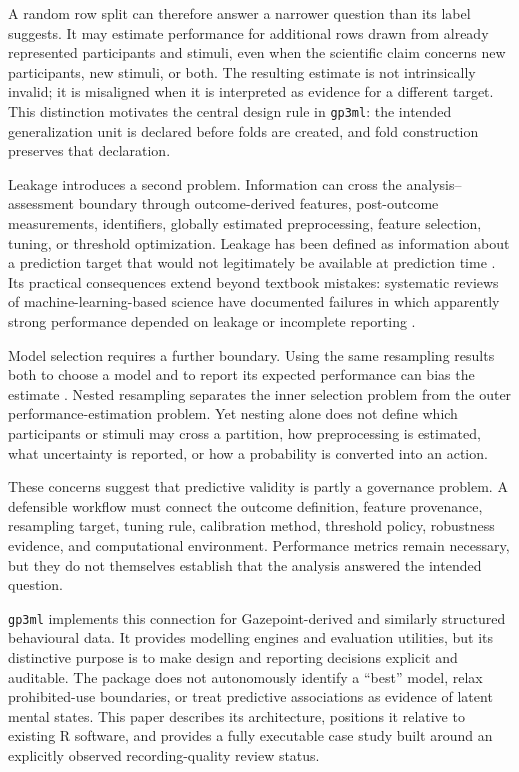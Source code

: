 A random row split can therefore answer a narrower question than its label suggests. It may estimate performance for additional rows drawn from already represented participants and stimuli, even when the scientific claim concerns new participants, new stimuli, or both. The resulting estimate is not intrinsically invalid; it is misaligned when it is interpreted as evidence for a different target. This distinction motivates the central design rule in \texttt{gp3ml}: the intended generalization unit is declared before folds are created, and fold construction preserves that declaration.

Leakage introduces a second problem. Information can cross the analysis--assessment boundary through outcome-derived features, post-outcome measurements, identifiers, globally estimated preprocessing, feature selection, tuning, or threshold optimization. Leakage has been defined as information about a prediction target that would not legitimately be available at prediction time \citep{Kaufman2012}. Its practical consequences extend beyond textbook mistakes: systematic reviews of machine-learning-based science have documented failures in which apparently strong performance depended on leakage or incomplete reporting \citep{Kapoor2023}.

Model selection requires a further boundary. Using the same resampling results both to choose a model and to report its expected performance can bias the estimate \citep{Varma2006, Cawley2010}. Nested resampling separates the inner selection problem from the outer performance-estimation problem. Yet nesting alone does not define which participants or stimuli may cross a partition, how preprocessing is estimated, what uncertainty is reported, or how a probability is converted into an action.

These concerns suggest that predictive validity is partly a governance problem. A defensible workflow must connect the outcome definition, feature provenance, resampling target, tuning rule, calibration method, threshold policy, robustness evidence, and computational environment. Performance metrics remain necessary, but they do not themselves establish that the analysis answered the intended question.

\texttt{gp3ml} \citep{gp3ml2026} implements this connection for Gazepoint-derived and similarly structured behavioural data. It provides modelling engines and evaluation utilities, but its distinctive purpose is to make design and reporting decisions explicit and auditable. The package does not autonomously identify a ``best'' model, relax prohibited-use boundaries, or treat predictive associations as evidence of latent mental states. This paper describes its architecture, positions it relative to existing R software, and provides a fully executable case study built around an explicitly observed recording-quality review status.

